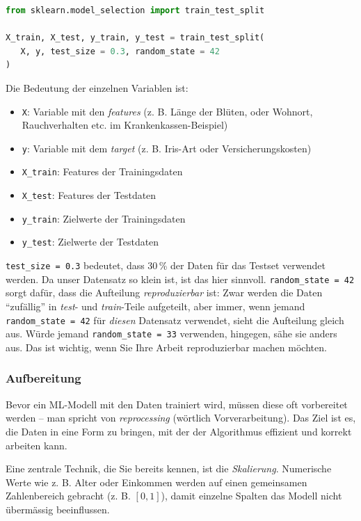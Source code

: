 \begin{lpu}
\begin{lstlisting}[language=Python]
from sklearn.model_selection import train_test_split

X_train, X_test, y_train, y_test = train_test_split(
   X, y, test_size = 0.3, random_state = 42
)
\end{lstlisting}


Die Bedeutung der einzelnen Variablen ist:

\begin{itemize}
  \item \texttt{X}: Variable mit den \textit{features} (z. B. Länge der Blüten, oder Wohnort, Rauchverhalten etc. im Krankenkassen-Beispiel)
  \item \texttt{y}: Variable mit dem \textit{target} (z. B. Iris-Art oder Versicherungskosten)

  \item \texttt{X\_train}: Features der Trainingsdaten
  \item \texttt{X\_test}: Features der Testdaten
  \item \texttt{y\_train}: Zielwerte der Trainingsdaten
  \item \texttt{y\_test}: Zielwerte der Testdaten
\end{itemize}

\texttt{test\_size = 0.3} bedeutet, dass 30\,\% der Daten für das Testset verwendet werden. Da unser Datensatz so klein ist, ist das hier sinnvoll.
\texttt{random\_state = 42} sorgt dafür, dass die Aufteilung \textit{reproduzierbar} ist: Zwar werden die Daten ``zufällig'' in \textit{test}- und \textit{train}-Teile aufgeteilt, aber immer, wenn jemand \texttt{random\_state = 42} für \textit{diesen} Datensatz verwendet, sieht die Aufteilung gleich aus. Würde jemand \texttt{random\_state = 33} verwenden, hingegen, sähe sie anders aus. Das ist wichtig, wenn Sie Ihre Arbeit reproduzierbar machen möchten.

\subsubsection*{Aufbereitung}

Bevor ein ML-Modell mit den Daten trainiert wird, müssen diese oft vorbereitet werden – man spricht von \textit{reprocessing} (wörtlich Vorverarbeitung). Das Ziel ist es, die Daten in eine Form zu bringen, mit der der Algorithmus effizient und korrekt arbeiten kann.

Eine zentrale Technik, die Sie bereits kennen, ist die \textit{Skalierung}. Numerische Werte wie z. B. Alter oder Einkommen werden auf einen gemeinsamen Zahlenbereich gebracht (z. B. $[0,1]$), damit einzelne Spalten das Modell nicht übermässig beeinflussen.


\end{lpu}
